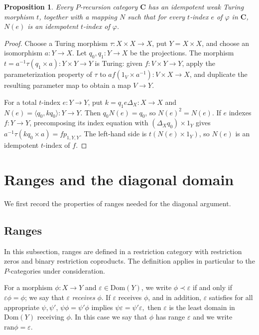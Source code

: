 \documentclass[letterpaper,10pt]{amsart}
\theoremstyle{plain}
\newtheorem{prop}{Proposition}[thm]
\theoremstyle{definition}
\begin{document}
\begin{prop}\label{IdempotentTheorem}
Every $P$-recursion category $\mathbf{C}$ has an idempotent weak
Turing morphism $t$, together with a mapping $N$ such that for
every $t$-index $e$ of $\varphi$ in $\mathbf{C}$, $N(e)$ is an
idempotent $t$-index of $\varphi$.
\end{prop}
\begin{proof}
Choose a Turing morphism $\tau:X\times X\to X$, put $Y=X\times X$,
and choose an isomorphism $a:Y\to X$. Let $q_0,q_1:Y\to X$ be
the projections. The morphism
$t=a^{-1}\tau(q_1\times a):Y\times Y\to Y$ is Turing: given
$f:V\times Y\to Y$, apply the
parameterization property of $\tau$ to
$af(1_V\times a^{-1}):V\times X\to X$, and duplicate the resulting
parameter map to obtain a map $V\to Y$.

For a total $t$-index $e:Y\to Y$, put
$k=q_1e\Delta_X:X\to X$ and $N(e)=\langle q_0,kq_0\rangle:Y\to Y$.
Then $q_0N(e)=q_0$, so $N(e)^2=N(e)$. If $e$ indexes
$f:Y\to Y$, precomposing its index equation with
$(\Delta_Xq_0)\times1_Y$ gives
$a^{-1}\tau(kq_0\times a)=fp_{1,Y,Y}$.
The left-hand side is $t(N(e)\times1_Y)$, so $N(e)$ is an
idempotent $t$-index of $f$.
\end{proof}

\section{Ranges and the diagonal domain}\label{sec:diagonal}

We first record the properties of ranges needed for the diagonal argument.

\subsection{Ranges}\label{sec:ranges}
In this subsection, ranges are defined in a restriction category with
restriction zeros and binary restriction coproducts. The definition
applies in particular to the $P$-categories under consideration.

For a morphism $\phi:X\to Y$ and $\varepsilon\in\mathrm{Dom}(Y)$, we write
$\phi\prec\varepsilon$ if and only if $\varepsilon\phi=\phi$; we
say that $\varepsilon$ {\it receives} $\phi$. If $\varepsilon$
receives $\phi$, and in addition, $\varepsilon$ satisfies for all
appropriate $\psi,\psi'$, $\psi\phi=\psi'\phi$ implies
$\psi\varepsilon=\psi'\varepsilon,$ then $\varepsilon$ is the
least domain in $\mathrm{Dom}(Y)$ receiving $\phi$. In this case
we say that $\phi$ has range $\varepsilon$ and we write
$\mathrm{ran}\phi=\varepsilon$.
\end{document}
